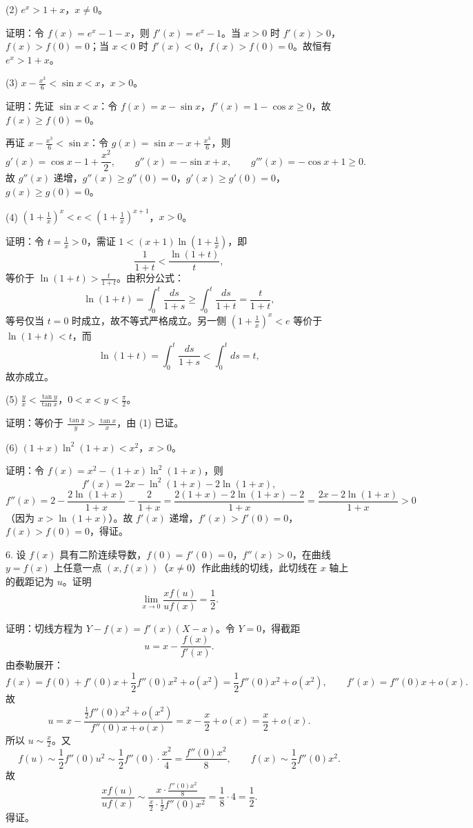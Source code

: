 (2) \(e^{x}>1+x\)，\(x\neq 0\)。

证明：令 \(f(x)=e^{x}-1-x\)，则 \(f'(x)=e^{x}-1\)。当 \(x>0\) 时 \(f'(x)>0\)，\(f(x)>f(0)=0\)；当 \(x<0\) 时 \(f'(x)<0\)，\(f(x)>f(0)=0\)。故恒有 \(e^{x}>1+x\)。

(3) \(x-\frac{x^{3}}{6}<\sin x<x\)，\(x>0\)。

证明：先证 \(\sin x<x\)：令 \(f(x)=x-\sin x\)，\(f'(x)=1-\cos x\ge 0\)，故 \(f(x)\ge f(0)=0\)。

再证 \(x-\frac{x^{3}}{6}<\sin x\)：令 \(g(x)=\sin x-x+\frac{x^{3}}{6}\)，则
\[ g'(x)=\cos x-1+\frac{x^{2}}{2},\qquad g''(x)=-\sin x+x,\qquad g'''(x)=-\cos x+1\ge 0. \]
故 \(g''(x)\) 递增，\(g''(x)\ge g''(0)=0\)，\(g'(x)\ge g'(0)=0\)，\(g(x)\ge g(0)=0\)。

(4) \(\left(1+\frac{1}{x}\right)^{x}<e<\left(1+\frac{1}{x}\right)^{x+1}\)，\(x>0\)。

证明：令 \(t=\frac{1}{x}>0\)，需证 \(1<(x+1)\ln\left(1+\frac{1}{x}\right)\)，即
\[ \frac{1}{1+t}<\frac{\ln(1+t)}{t}, \]
等价于 \(\ln(1+t)>\frac{t}{1+t}\)。由积分公式：
\[ \ln(1+t)=\int_0^t\frac{ds}{1+s}\ge\int_0^t\frac{ds}{1+t}=\frac{t}{1+t}, \]
等号仅当 \(t=0\) 时成立，故不等式严格成立。另一侧 \(\left(1+\frac{1}{x}\right)^{x}<e\) 等价于 \(\ln(1+t)<t\)，而
\[ \ln(1+t)=\int_0^t\frac{ds}{1+s}<\int_0^t ds=t, \]
故亦成立。

(5) \(\frac{y}{x}<\frac{\tan y}{\tan x}\)，\(0<x<y<\frac{\pi}{2}\)。

证明：等价于 \(\frac{\tan y}{y}>\frac{\tan x}{x}\)，由 (1) 已证。

(6) \((1+x)\ln^{2}(1+x)<x^{2}\)，\(x>0\)。

证明：令 \(f(x)=x^{2}-(1+x)\ln^{2}(1+x)\)，则
\[ f'(x)=2x-\ln^{2}(1+x)-2\ln(1+x), \]
\[ f''(x)=2-\frac{2\ln(1+x)}{1+x}-\frac{2}{1+x}=\frac{2(1+x)-2\ln(1+x)-2}{1+x}=\frac{2x-2\ln(1+x)}{1+x}>0 \]
（因为 \(x>\ln(1+x)\)）。故 \(f'(x)\) 递增，\(f'(x)>f'(0)=0\)，\(f(x)>f(0)=0\)，得证。

6. 设 \(f(x)\) 具有二阶连续导数，\(f(0)=f'(0)=0\)，\(f''(x)>0\)，在曲线 \(y=f(x)\) 上任意一点 \((x,f(x))\)（\(x\neq 0\)）作此曲线的切线，此切线在 \(x\) 轴上的截距记为 \(u\)。证明
\[ \lim_{x\to 0}\frac{xf(u)}{uf(x)}=\frac{1}{2}. \]

证明：切线方程为 \(Y-f(x)=f'(x)(X-x)\)。令 \(Y=0\)，得截距
\[ u=x-\frac{f(x)}{f'(x)}. \]
由泰勒展开：
\[ f(x)=f(0)+f'(0)x+\frac{1}{2}f''(0)x^{2}+o(x^{2})=\frac{1}{2}f''(0)x^{2}+o(x^{2}),\qquad f'(x)=f''(0)x+o(x). \]
故
\[ u=x-\frac{\frac{1}{2}f''(0)x^{2}+o(x^{2})}{f''(0)x+o(x)}=x-\frac{x}{2}+o(x)=\frac{x}{2}+o(x). \]
所以 \(u\sim\frac{x}{2}\)。又
\[ f(u)\sim\frac{1}{2}f''(0)u^{2}\sim\frac{1}{2}f''(0)\cdot\frac{x^{2}}{4}=\frac{f''(0)x^{2}}{8},\qquad f(x)\sim\frac{1}{2}f''(0)x^{2}. \]
故
\[ \frac{xf(u)}{uf(x)}\sim\frac{x\cdot\frac{f''(0)x^{2}}{8}}{\frac{x}{2}\cdot\frac{1}{2}f''(0)x^{2}}=\frac{1}{8}\cdot 4=\frac{1}{2}. \]
得证。

